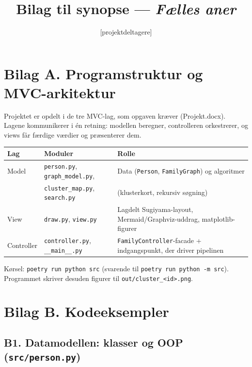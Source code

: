 \documentclass[12pt, a4paper]{article}
\title{Bilag til synopse --- \textit{Fælles aner}}
\author{[projektdeltagere]}
\date{}
\begin{document}
\maketitle

\section*{Bilag A. Programstruktur og MVC-arkitektur}

Projektet er opdelt i de tre MVC-lag, som opgaven kræver (Projekt.docx). Lagene
kommunikerer i én retning: modellen beregner, controlleren orkestrerer, og
views får færdige værdier og præsenterer dem.

\begin{center}
\begin{tabular}{@{}llp{}@{}}
\toprule
\textbf{Lag} & \textbf{Moduler} & \textbf{Rolle} \\
\midrule
Model & \texttt{person.py}, \texttt{graph\_model.py}, & Data (\texttt{Person},
\texttt{FamilyGraph}) og algoritmer \\
      & \texttt{cluster\_map.py}, \texttt{search.py} & (klusterkort, rekursiv søgning) \\
View & \texttt{draw.py}, \texttt{view.py} & Lagdelt Sugiyama-layout, Mermaid/Graphviz-uddrag,
matplotlib-figurer \\
Controller & \texttt{controller.py}, \texttt{\_\_main\_\_.py} & \texttt{FamilyController}-facade
+ indgangspunkt, der driver pipelinen \\
\bottomrule
\end{tabular}
\end{center}

Kørsel: \texttt{poetry run python src} (svarende til \texttt{poetry run python -m src}).
Programmet skriver desuden figurer til \texttt{out/cluster\_<id>.png}.

\section*{Bilag B. Kodeeksempler}

\subsection*{B1. Datamodellen: klasser og OOP (\texttt{src/person.py})}
\end{document}

